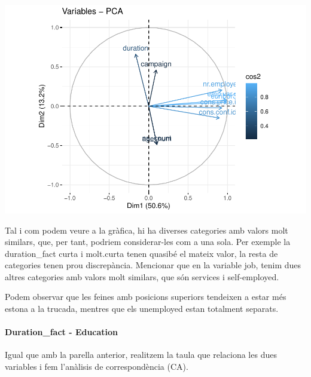 \documentclass[
]{article}
\newenvironment{Shaded}{\begin{snugshade}}{\end{snugshade}}
\newcommand{\AttributeTok}[1]{\textcolor[rgb]{0.77,0.63,0.00}{#1}}
\newcommand{\FunctionTok}[1]{\textcolor[rgb]{0.00,0.00,0.00}{#1}}
\newcommand{\NormalTok}[1]{#1}
\newcommand{\OtherTok}[1]{\textcolor[rgb]{0.56,0.35,0.01}{#1}}
\newcommand{\SpecialCharTok}[1]{\textcolor[rgb]{0.00,0.00,0.00}{#1}}
\newcommand{\StringTok}[1]{\textcolor[rgb]{0.31,0.60,0.02}{#1}}
\begin{document}
\includegraphics{Entrega2_files/figure-latex/unnamed-chunk-5-1.pdf}

Tal i com podem veure a la gràfica, hi ha diverses categories amb valors
molt similars, que, per tant, podriem considerar-les com a una sola. Per
exemple la duration\_fact curta i molt.curta tenen quasibé el mateix
valor, la resta de categories tenen prou discrepància. Mencionar que en
la variable job, tenim dues altres categories amb valors molt similars,
que són services i self-employed.

Podem observar que les feines amb posicions superiors tendeixen a estar
més estona a la trucada, mentres que els unemployed estan totalment
separats.

\hypertarget{duration_fact---education}{%
\paragraph{Duration\_fact - Education}\label{duration_fact---education}}

Igual que amb la parella anterior, realitzem la taula que relaciona les
dues variables i fem l'anàlisis de correspondència (CA).

\begin{Shaded}
\end{Shaded}
\end{document}

